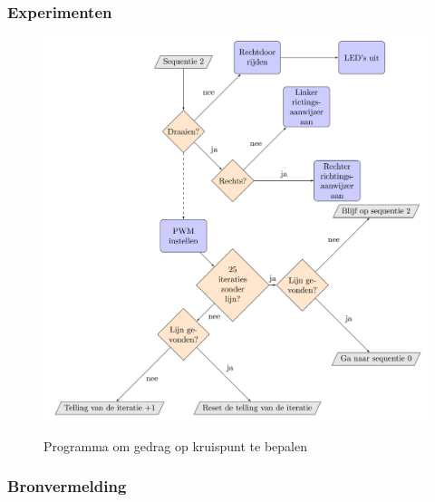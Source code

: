 \documentclass
   [kulak] %
   {kulakbeamer}
\begin{document}
\begin{frame}
	\frametitle{Experimenten}
	\begin{figure}
		\centering
		\includegraphics[width=.7\textwidth]{flowchart_grootProgramma}
		\caption{Programma om gedrag op kruispunt te bepalen}\cite{}
	\end{figure}
\end{frame}

\begin{frame}
\frametitle{Bronvermelding}
	
	
	
\end{frame}
\end{document}
